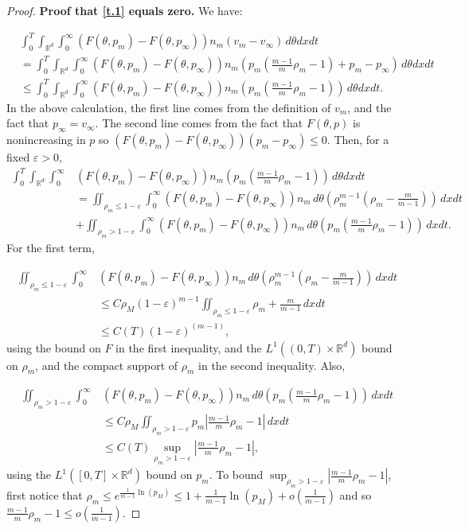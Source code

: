 \documentclass{amsart}
\def\R{\mathbb R}
\begin{document}
\begin{proof}
\medskip
 \noindent \textbf{Proof that \eqref{t.1} equals zero.} We have:
   
   \begin{align}\label{split}
       &\int_{0}^{T}\int_{\R^d}\int_{0}^{\infty}(F(\theta,p_m)-F(\theta,p_\infty))n_m(v_m-v_\infty)\,d\theta dx dt  \nonumber\\&=\int_{0}^{T}\int_{\R^d}\int_{0}^{\infty}(F(\theta,p_m)-F(\theta,p_\infty))n_m(p_m(\frac{m-1}{m}\rho_m-1)+p_m-p_\infty)\,d\theta dx dt \nonumber \\
       &\leq \int_{0}^{T}\int_{\R^d}\int_{0}^{\infty}(F(\theta,p_m)-F(\theta,p_\infty))n_m(p_m(\frac{m-1}{m}\rho_m-1))\, d\theta dx dt.
   \end{align}
  In the above calculation, the first line comes from the definition of $v_m$, and the fact that $p_\infty=v_\infty$. The second line comes from the fact that $F(\theta,p)$ is nonincreasing in $p$ so $(F(\theta,p_m)-F(\theta,p_\infty))(p_m-p_\infty)\leq 0.$
  Then, for a fixed $\varepsilon>0,$
  \begin{align*}
    \int_{0}^{T}\int_{\R^d}\int_{0}^{\infty}&(F(\theta,p_m)-F(\theta,p_\infty))n_m(p_m(\frac{m-1}{m}\rho_m-1))\, d\theta dx dt\\&=\iint_{\rho_m\leq 1-\varepsilon}\int_{0}^{\infty}(F(\theta,p_m)-F(\theta,p_\infty))n_m\,d\theta (\rho_m^{m-1}(\rho_m-\frac{m}{m-1}))\,dxdt \\&+\iint_{\rho_m> 1-\varepsilon}\int_{0}^{\infty}(F(\theta,p_m)-F(\theta,p_\infty))n_m\,d\theta (p_m(\frac{m-1}{m}\rho_m-1))\,dxdt. 
  \end{align*}
  For the first term,

\begin{align*}
    \iint_{\rho_m\leq 1-\varepsilon}\int_{0}^{\infty} &(F(\theta,p_m)-F(\theta,p_\infty))n_m\,d\theta (\rho_m^{m-1}(\rho_m-\frac{m}{m-1}))\,dxdt \\
    & \leq C\rho_M(1-\varepsilon)^{m-1}\iint_{\rho_m\leq 1-\varepsilon}\rho_m +\frac{m}{m-1}\,dxdt \\
    & \leq C(T)(1-\varepsilon)^{(m-1)},
\end{align*}
using the bound on $F$ in the first inequality, and the $L^1((0,T)\times\R^d)$ bound on $\rho_m$, and the compact support of $\rho_m$ in the second inequality.
Also,

  \begin{align*}
      \iint_{\rho_m> 1-\varepsilon}\int_{0}^{\infty}&(F(\theta,p_m)-F(\theta,p_\infty)) n_m\,d\theta (p_m(\frac{m-1}{m}\rho_m-1))\,dxdt \\& \leq C\rho_M\iint_{\rho_m>1-\varepsilon}p_m|\frac{m-1}{m}\rho_m-1|\,dxdt \\
      & \leq C(T)\sup_{\rho_m>1-\varepsilon}|\frac{m-1}{m}\rho_m-1|,
  \end{align*}
  using the $L^1([0,T]\times \R^d)$ bound on $p_m$.
 To bound $\sup_{\rho_m>1-\varepsilon}|\frac{m-1}{m}\rho_m-1|$, first notice that $\rho_m\leq e^{\frac{1}{m-1}\ln(p_M)}\leq 1+\frac{1}{m-1}\ln(p_M)+o(\frac{1}{m-1})$ and so $\frac{m-1}{m}\rho_m-1\leq o(\frac{1}{m-1}).$ 
 

\end{proof}
\end{document}

